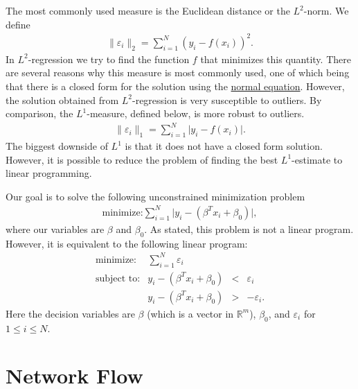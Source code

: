 \documentclass[
]{book}
\theoremstyle{definition}
\theoremstyle{definition}
\theoremstyle{definition}
\theoremstyle{definition}
\theoremstyle{remark}
\begin{document}
The most commonly used measure is the Euclidean distance or the \(L^2\)-norm. We define
\begin{align*}
  \| \varepsilon_i \|_2 = \sum \limits_{i = 1}^N (y_i - f(x_i))^2 .
\end{align*}
In \(L^2\)-regression we try to find the function \(f\) that minimizes this quantity.
There are several reasons why this measure is most commonly used, one of which being that there is a closed form for the solution using the \href{https://en.wikipedia.org/wiki/Ordinary_least_squares\#Matrix/vector_formulation}{normal equation}.
However, the solution obtained from \(L^2\)-regression is very susceptible to outliers.
By comparison, the \(L^1\)-measure, defined below, is more robust to outliers.
\begin{align*}
  \| \varepsilon_i \|_1 = \sum \limits_{i = 1}^N \lvert y_i - f(x_i) \rvert.
\end{align*}
The biggest downside of \(L^1\) is that it does not have a closed form solution.
However, it is possible to reduce the problem of finding the best \(L^1\)-estimate to linear programming.

Our goal is to solve the following unconstrained minimization problem
\begin{align*}
  \mbox{minimize:} \sum \limits_{i = 1}^N \lvert y_i - (\beta^T x_i + \beta_0) \rvert,
\end{align*}
where our variables are \(\beta\) and \(\beta_0\).
As stated, this problem is not a linear program.
However, it is equivalent to the following linear program:
\begin{equation*}
  \begin{array}{lllr}
    \mbox{minimize:} & \sum \limits_{i = 1}^N \varepsilon_i \\
    \mbox{subject to:} 
      & y_i - (\beta^T x_i + \beta_0) & < & \varepsilon_i \\
      & y_i - (\beta^T x_i + \beta_0) & > & -\varepsilon_i.
  \end{array}
\end{equation*}
Here the decision variables are \(\beta\) (which is a vector in \(\mathbb{R}^m\)), \(\beta_0\), and
\(\varepsilon_i\) for \(1 \le i \le N\).

\hypertarget{network-flow}{%
\chapter{Network Flow}\label{network-flow}}
\end{document}
